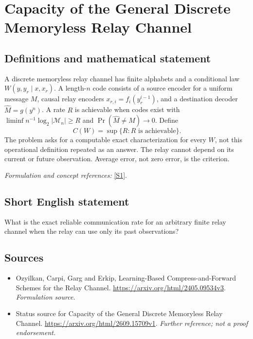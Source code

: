 \documentclass[11pt]{article}
\begin{document}
\section*{\texorpdfstring{Capacity of the General Discrete Memoryless Relay Channel}{Capacity of the General Discrete Memoryless Relay Channel}}\label{167}
\subsection{Definitions and mathematical statement}
A discrete memoryless relay channel has finite alphabets and a conditional law $W(y,y_r\mid x,x_r)$. A length-$n$ code consists of a source encoder for a uniform message $M$, causal relay encoders $x_{r,i}=f_i(y_r^{i-1})$, and a destination decoder $\widehat M=g(y^n)$. A rate $R$ is achievable when codes exist with $\liminf n^{-1}\log_2|\mathcal M_n|\ge R$ and $\Pr(\widehat M\ne M)\to0$. Define
\[
 C(W)=\sup\{R:R\text{ is achievable}
 \}.
\]
The problem asks for a computable exact characterization for every $W$, not this operational definition repeated as an answer. The relay cannot depend on its current or future observation. Average error, not zero error, is the criterion.
\par\smallskip\textit{Formulation and concept references:} \href{https://arxiv.org/html/2405.09534v3}{[S1]}.

\subsection{Short English statement}
What is the exact reliable communication rate for an arbitrary finite relay channel when the relay can use only its past observations?
\subsection{Sources}
\begin{itemize}
\item[S1]Ozyilkan, Carpi, Garg and Erkip, Learning-Based Compress-and-Forward Schemes for the Relay Channel.
\url{https://arxiv.org/html/2405.09534v3}.
\textit{Formulation source.}
\item[S2]Status source for Capacity of the General Discrete Memoryless Relay Channel.
\url{https://arxiv.org/html/2609.15709v1}.
\textit{Further reference; not a proof endorsement.}
\end{itemize}
\end{document}
